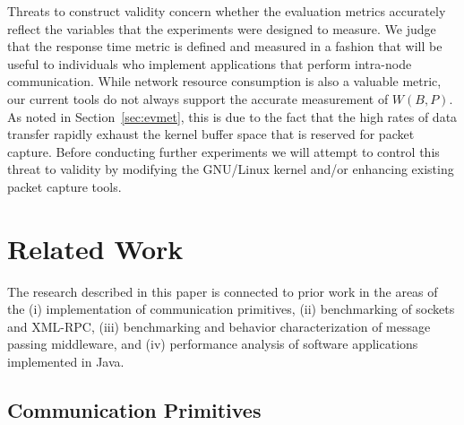 \documentclass{sig-alternate}
\begin{document}
Threats to construct validity concern whether the evaluation metrics
accurately reflect the variables that the experiments were designed to
measure.  We judge that the response time metric is defined and
measured in a fashion that will be useful to individuals who implement
applications that perform intra-node communication.  While network
resource consumption is also a valuable metric, our current tools do
not always support the accurate measurement of $W(B, P)$.  As noted in
Section~\ref{sec:evmet}, this is due to the fact that the high rates
of data transfer rapidly exhaust the kernel buffer space that is
reserved for packet capture.  Before conducting further experiments we
will attempt to control this threat to validity by modifying the
GNU/Linux kernel and/or enhancing existing packet capture tools.

\vspace*{-.1in}

\section{Related Work}
\label{sec:related-work}

The research described in this paper is connected to prior work in the
areas of the (i) implementation of communication primitives, (ii)
benchmarking of sockets and XML-RPC, (iii) benchmarking and behavior
characterization of message passing middleware, and (iv) performance
analysis of software applications implemented in Java.


\subsection{Communication Primitives}
\label{sec:comm-prim-rw}
\end{document}
